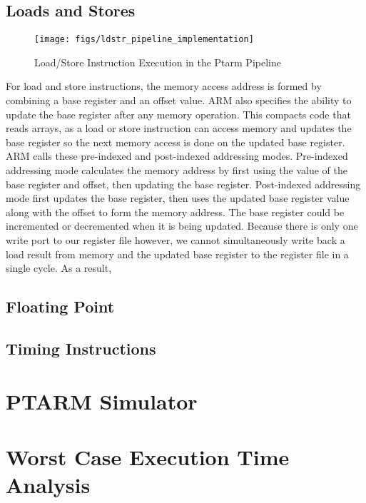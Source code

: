 \subsection{Loads and Stores}
\begin{figure}
  \vspace{-20pt}
  \begin{center}
    \texttt{[image: figs/ldstr\_pipeline\_implementation]}
  \end{center}
  \vspace{-20pt}
  \caption{Load/Store Instruction Execution in the Ptarm Pipeline}
  \label{fig:ldstr_pipeline_implementation}
\end{figure}
For load and store instructions, the memory access address is formed by combining a base register and an offset value. 
ARM also specifies the ability to update the base register after any memory operation. 
This compacts code that reads arrays, as a load or store instruction can access memory and updates the base register so the next memory access is done on the updated base register.
ARM calls these pre-indexed and post-indexed addressing modes. 
Pre-indexed addressing mode calculates the memory address by first using the value of the base register and offset, then updating the base register. 
Post-indexed addressing mode first updates the base register, then uses the updated base register value along with the offset to form the memory address. 
The base register could be incremented or decremented when it is being updated.   
Because there is only one write port to our register file however, we cannot simultaneously write back a load result from memory and the updated base register to the register file in a single cycle. 
As a result, 
\subsection{Floating Point}

\subsection{Timing Instructions}

\section{PTARM Simulator}
\label{sec:ptarm_sim}

\section{Worst Case Execution Time Analysis}
\label{sec:wcet}




